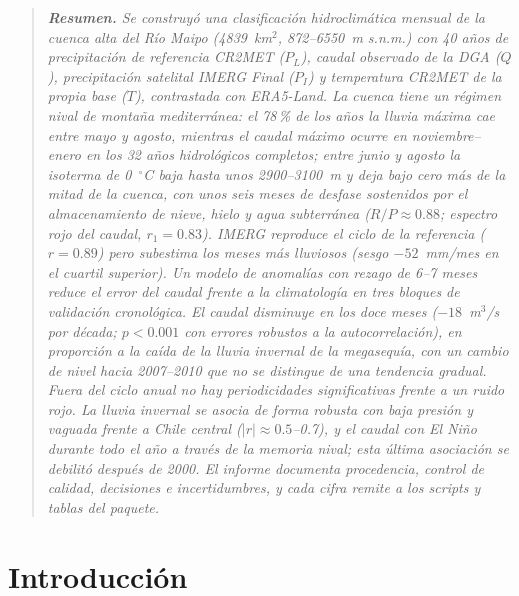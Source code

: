 \documentclass[11pt,a4paper]{article}
\newcommand{\PL}{P_L}
\newcommand{\PI}{P_I}
\newcommand{\Qm}{Q}
\begin{document}
\vspace{0.3cm}
\begin{quote}
\small\itshape
\textbf{Resumen.} Se construyó una clasificación hidroclimática mensual de la cuenca alta del Río Maipo (4839~km$^2$, 872--6550~m s.n.m.) con 40 años de precipitación de referencia CR2MET ($\PL$), caudal observado de la DGA ($\Qm$), precipitación satelital IMERG Final ($\PI$) y temperatura CR2MET de la propia base ($T$), contrastada con ERA5-Land. La cuenca tiene un régimen \emph{nival de montaña mediterránea}: el 78\,\% de los años la lluvia máxima cae entre mayo y agosto, mientras el caudal máximo ocurre en noviembre--enero en los 32 años hidrológicos completos; entre junio y agosto la isoterma de 0~$^\circ$C baja hasta unos 2900--3100~m y deja bajo cero más de la mitad de la cuenca, con unos seis meses de desfase sostenidos por el almacenamiento de nieve, hielo y agua subterránea ($R/P\approx0.88$; espectro rojo del caudal, $r_1=0.83$). IMERG reproduce el ciclo de la referencia ($r=0.89$) pero subestima los meses más lluviosos (sesgo $-52$~mm/mes en el cuartil superior). Un modelo de anomalías con rezago de 6--7 meses reduce el error del caudal frente a la climatología en tres bloques de validación cronológica. El caudal disminuye en los doce meses ($-18$~m$^3$/s por década; $p<0.001$ con errores robustos a la autocorrelación), en proporción a la caída de la lluvia invernal de la megasequía, con un cambio de nivel hacia 2007--2010 que no se distingue de una tendencia gradual. Fuera del ciclo anual no hay periodicidades significativas frente a un ruido rojo. La lluvia invernal se asocia de forma robusta con baja presión y vaguada frente a Chile central ($|r|\approx0.5$--0.7), y el caudal con El Niño durante todo el año a través de la memoria nival; esta última asociación se debilitó después de 2000. El informe documenta procedencia, control de calidad, decisiones e incertidumbres, y cada cifra remite a los scripts y tablas del paquete.
\end{quote}

\vspace{0.2cm}

\tableofcontents

\newpage
\section{Introducción}
\end{document}
